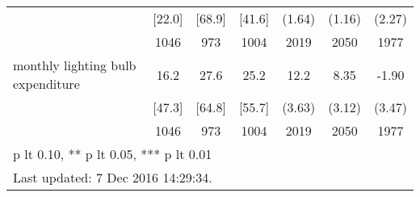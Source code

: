\begin{table}[htbp]
\begin{tabular*}{1\hsize}{@{\hskip\tabcolsep\extracolsep\fill}l*{1}{cccccc}}
                                &   [22.0]&   [68.9]&   [41.6]&   (1.64)         &   (1.16)         &   (2.27)         \\
                                &     1046&      973&     1004&     2019         &     2050         &     1977         \\
monthly lighting bulb expenditure&     16.2&     27.6&     25.2&     12.2\sym{***}&     8.35\sym{***}&    -1.90         \\
                                &   [47.3]&   [64.8]&   [55.7]&   (3.63)         &   (3.12)         &   (3.47)         \\
                                &     1046&      973&     1004&     2019         &     2050         &     1977         \\
\bottomrule
\multicolumn{7}{l}{\footnotesize * p lt 0.10, ** p lt 0.05, *** p lt 0.01}\\
\multicolumn{7}{l}{\footnotesize Last updated:  7 Dec 2016 14:29:34.}\\
\end{tabular*}
\end{table}

